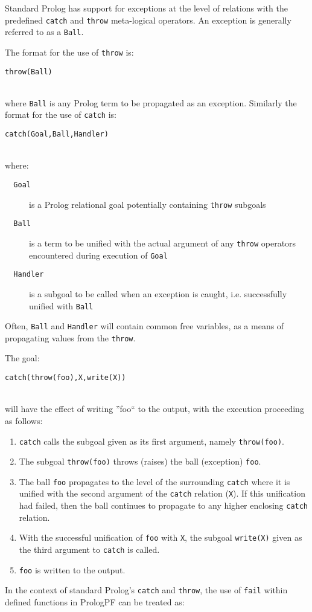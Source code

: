 Standard Prolog \cite{DEDC96} has support for exceptions at the
level of relations with the predefined \texttt{catch} and \texttt{throw}
meta-logical operators.  An exception is generally referred to as a 
\texttt{Ball}.

The format for the use of \texttt{throw} is:\\
\centerline{\texttt{throw(Ball)}}\\
where \texttt{Ball} is any Prolog term to be propagated as an exception.
Similarly the format for the use of \texttt{catch} is:\\
\centerline{\texttt{catch(Goal,Ball,Handler)}}\\
where:
\begin{description}
\item[\texttt{~~Goal}]{ is a Prolog relational goal potentially containing
  \texttt{throw} subgoals}
\item[\texttt{~~Ball}]{ is a term to be unified with the actual argument of any
  \texttt{throw} operators encountered during execution of \texttt{Goal}}
\item[\texttt{~~Handler}]{ is a subgoal to be called when an exception is
  caught, i.e. successfully unified with \texttt{Ball}}
\end{description}
Often, \texttt{Ball} and \texttt{Handler} will contain common free
variables, as a means of propagating values from the \texttt{throw}.

The goal:\\
\centerline{\texttt{catch(throw(foo),X,write(X))}}\\
will have the effect of writing ''foo`` to the output, with the
execution proceeding as follows:
\begin{enumerate}
\item{\texttt{catch} calls the subgoal given as its first argument,
  namely \texttt{throw(foo)}.}
\item{The subgoal \texttt{throw(foo)} throws (raises) the ball (exception)
  \texttt{foo}.}
\item{The ball \texttt{foo} 
  propagates to the level of the surrounding \texttt{catch}
  where it is unified with the second argument of the \texttt{catch}
  relation (\texttt{X}).  If this unification had failed, then the ball
  continues to propagate to any higher enclosing \texttt{catch} relation.}
\item{With the successful unification of \texttt{foo} with \texttt{X},
  the subgoal \texttt{write(X)}
  given as the third argument to \texttt{catch} is called.}
\item{\texttt{foo} is written to the output.}
\end{enumerate}
In the context of standard Prolog's \texttt{catch} and \texttt{throw},
the use of \texttt{fail} within defined functions in PrologPF can be 
treated as:\\


